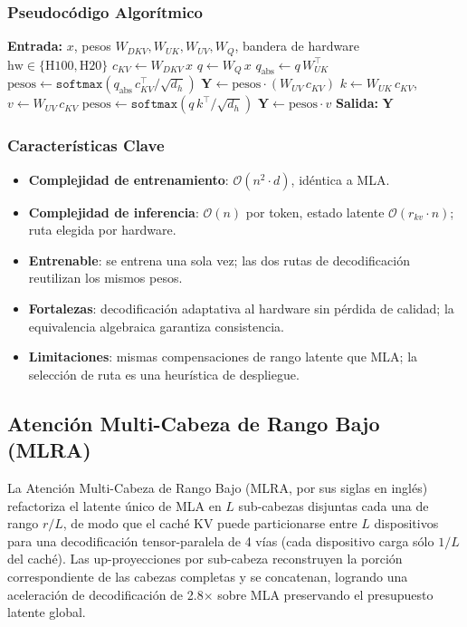 \subsubsection{Pseudocódigo Algorítmico}
\begin{algorithmic}[1]
\State \textbf{Entrada:} $x$, pesos $W_{DKV}, W_{UK}, W_{UV}, W_{Q}$, bandera de hardware $\text{hw} \in \{\text{H100}, \text{H20}\}$
\State $c_{KV} \gets W_{DKV}\, x$ 
\State $q \gets W_{Q}\, x$
 
    \State $q_{\text{abs}} \gets q\, W_{UK}^\top$ 
    \State $\text{pesos} \gets \texttt{softmax}(q_{\text{abs}}\, c_{KV}^\top / \sqrt{d_h})$
    \State $\mathbf{Y} \gets \text{pesos} \cdot (W_{UV}\, c_{KV})$
\Else {}
    \State $k \gets W_{UK}\, c_{KV}$, \quad $v \gets W_{UV}\, c_{KV}$
    \State $\text{pesos} \gets \texttt{softmax}(q\, k^\top / \sqrt{d_h})$
    \State $\mathbf{Y} \gets \text{pesos} \cdot v$
\EndIf
\State \textbf{Salida:} $\mathbf{Y}$
\end{algorithmic}

\subsubsection{Características Clave}
\begin{itemize}[leftmargin=*]
    \item \textbf{Complejidad de entrenamiento}: $\mathcal{O}(n^2 \cdot d)$, idéntica a MLA.
    \item \textbf{Complejidad de inferencia}: $\mathcal{O}(n)$ por token, estado latente $\mathcal{O}(r_{kv} \cdot n)$; ruta elegida por hardware.
    \item \textbf{Entrenable}: se entrena una sola vez; las dos rutas de decodificación reutilizan los mismos pesos.
    \item \textbf{Fortalezas}: decodificación adaptativa al hardware sin pérdida de calidad; la equivalencia algebraica garantiza consistencia.
    \item \textbf{Limitaciones}: mismas compensaciones de rango latente que MLA; la selección de ruta es una heurística de despliegue.
\end{itemize}

\subsection{Atención Multi-Cabeza de Rango Bajo (MLRA)}
La Atención Multi-Cabeza de Rango Bajo (MLRA, por sus siglas en inglés) \citep{liu_mlra_2026} refactoriza el latente único de MLA en $L$ sub-cabezas disjuntas cada una de rango $r/L$, de modo que el caché KV puede particionarse entre $L$ dispositivos para una decodificación tensor-paralela de 4 vías (cada dispositivo carga sólo $1/L$ del caché). Las up-proyecciones por sub-cabeza reconstruyen la porción correspondiente de las cabezas completas y se concatenan, logrando una aceleración de decodificación de 2.8$\times$ sobre MLA preservando el presupuesto latente global.

